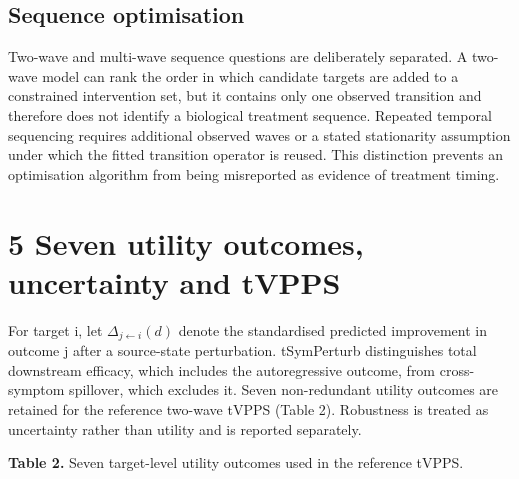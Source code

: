 \documentclass[11pt]{article}
\begin{document}
\subsection{Sequence optimisation}\label{sequence-optimisation}

Two-wave and multi-wave sequence questions are deliberately separated. A
two-wave model can rank the order in which candidate targets are added
to a constrained intervention set, but it contains only one observed
transition and therefore does not identify a biological treatment
sequence. Repeated temporal sequencing requires additional observed
waves or a stated stationarity assumption under which the fitted
transition operator is reused. This distinction prevents an optimisation
algorithm from being misreported as evidence of treatment timing.

\section{5 Seven utility outcomes, uncertainty and
tVPPS}\label{seven-utility-outcomes-uncertainty-and-tvpps}

For target i, let \(\Delta_{j\leftarrow i}(d)\) denote the standardised predicted improvement
in outcome j after a source-state perturbation. tSymPerturb
distinguishes total downstream efficacy, which includes the
autoregressive outcome, from cross-symptom spillover, which excludes it.
Seven non-redundant utility outcomes are retained for the reference
two-wave tVPPS (Table 2). Robustness is treated as uncertainty rather
than utility and is reported separately.

\noindent\textbf{Table 2.} Seven target-level utility outcomes used in the reference tVPPS.
\end{document}
